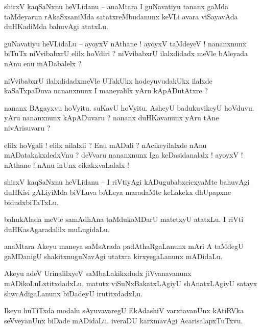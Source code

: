 \documentclass{article}
\begin{document}
\begin{mn}%
shirxV kaqSaNxnu heVLidanu -- anaMtara I guNavatiyu tananx gaMda taMdeyarun rAkaSxsaniMda 
satatxreMbudanunx keVLi avara viSayavAda duHKadiMda bahuvAgi atatxLu.
\end{mn}

\begin{mn}%
guNavatiyu heVLidaLu -- ayoyxV nAthane ! ayoyxV taMdeyeV ! nananxnunx biTuTx niVvibabxrU elilx 
hoVdiri ? niVvibabxrU ilalxdidadx meVle bAleyada nAnu enu mADabalelx ?
\end{mn}

\begin{mn}%
niVvibabxrU ilalxdidadxmeVle UTakUkx hodeyuvudakUkx ilalxde kaSaTxpaDuva nananxnunx I maneyalilx 
yAru kApADutAtxre ?
\end{mn}

\begin{mn}%
nananx BAgayxvu hoVyitu. suKavU hoVyitu. AsheyU badukuvikeyU hoVduvu. yAru nananxnunx kApADuvaru ? 
nananx duHKavanunx yAru tAne nivArisuvaru ?
\end{mn}

\begin{mn}%
elilx hoVgali ! elilx nilalxli ? Enu mADali ? nAcikeyilalxde nAnu mADatakakxdedxVnu ? deVvaru 
nananxnunx Iga keDasidanalalx ! ayoyxV ! nAthane ! nAnu inUnx cikakxvaLalalx !
\end{mn}

\begin{mn}%
shirxV kaqSaNxnu heVLidanu -- I riVtiyAgi kADugubabxcicxyaMte bahuvAgi duHKisi gALiyiMda biVLuva 
bALeya maradaMte keLakekx dhUpapxne bidudxbiTaTxLu.
\end{mn}

\begin{mn}%
bahukAlada meVle samAdhAna taMdukoMDarU matetxyU atatxLu. I riVti duHKasAgaradalilx muLugidaLu.
\end{mn}

\begin{mn}%
anaMtara Akeyu maneya saMsArada padAthaRgaLanunx mAri A taMdegU gaMDanigU shakitxnuguNavAgi utatxra 
kirxyegaLanunx mADidaLu.
\end{mn}

\begin{mn}%
Akeyu adeV UrinalilxyeV saMbaLakikxdudx jiVvanavanunx mADikoLuLxtitxdadxLu. matutx 
viSuNxBakatxLAgiyU shAnatxLAgiyU satayx shwcAdigaLanunx biDadeyU irutitxdadxLu.
\end{mn}

\begin{mn}%
Ikeyu huTiTxda modalu sAyuvavaregU EkAdashiV varxtavanUnx kAtiRVka seVveyanUnx  biDade mADidaLu. 
iveraDU karxmavAgi AcarisalapxTuTxvu.
\end{mn}
\end{document}

